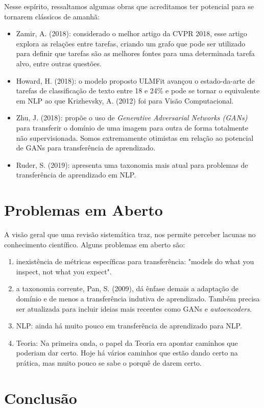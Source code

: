 \documentclass[sigconf]{acmart}
\begin{document}
  Nesse espírito, ressaltamos algumas obras que acreditamos ter potencial para se tornarem clássicos de amanhã:
  \begin{itemize}
    \item Zamir, A. (2018)\cite{taskonomy}: considerado o melhor artigo da CVPR 2018, esse artigo explora as relações entre tarefas, criando um grafo que pode ser utilizado para definir que tarefas são as melhores fontes para uma determinada tarefa alvo, entre outras questões.
    \item Howard, H. (2018)\cite{ulmfit}: o modelo proposto ULMFit avançou o estado-da-arte de tarefas de classificação de texto entre 18 e 24\% e pode se tornar o equivalente em NLP ao que Krizhevsky, A. (2012)\cite{alexnet} foi para Visão Computacional. 
    \item Zhu, J. (2018)\cite{CycleGan}: propõe o uso de \emph{Generative Adversarial Networks (GANs)} para transferir o domínio de uma imagem para outra de forma totalmente não supervisionada.  Somos extremamente otimistas em relação ao potencial de GANs para transferência de aprendizado.
    \item Ruder, S. (2019)\cite{Ruder2019Neural}: apresenta uma taxonomia mais atual para problemas de transferência de aprendizado em NLP.
  \end{itemize}

\section{Problemas em Aberto}\label{emAberto}
A visão geral que uma revisão sistemática traz, nos permite perceber lacunas no conhecimento científico. Alguns problemas em aberto são:
\begin{enumerate}
  \item inexistência de métricas específicas para transferência: "models do what you inspect, not what you expect".
  \item a taxonomia corrente, Pan, S. (2009)\cite{PanYang}, dá ênfase demais a adaptação de domínio e de menos a transferência indutiva de aprendizado. Também precisa ser atualizada para incluir ideias mais recentes como GANs e \emph{autoencoders}. 
  \item NLP: ainda há muito pouco em transferência de aprendizado para NLP.
  \item Teoria: Na primeira onda, o papel da Teoria era apontar caminhos que poderiam dar certo. Hoje há vários caminhos que estão dando certo na prática, mas muito pouco se sabe  o porquê de darem certo. 
\end{enumerate}

\section{Conclusão}\label{conclusao}
\lipsum[3]


\end{document}
